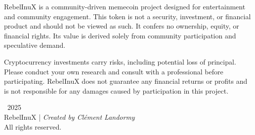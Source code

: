 \documentclass{article}
\begin{document}
\begin{tcolorbox}[colback=backgroundColor!10!white, colframe=headerColor, boxrule=0.8mm, title=Legal Disclaimer, fonttitle=\bfseries]
RebelInuX is a community-driven memecoin project designed for entertainment and community engagement. This token is not a security, investment, or financial product and should not be viewed as such. It confers no ownership, equity, or financial rights. Its value is derived solely from community participation and speculative demand.
\medskip
\noindent
{}

\medskip
\noindent
Cryptocurrency investments carry risks, including potential loss of principal. Please conduct your own research and consult with a professional before participating. RebelInuX does not guarantee any financial returns or profits and is not responsible for any damages caused by participation in this project.
\end{tcolorbox}


\vspace{1em}

\begin{center}
\small \textcopyright\, 2025 \\
RebelInuX \quad | \quad \textit{Created by Clément Landormy} \\
All rights reserved.
\end{center}
\end{document}
